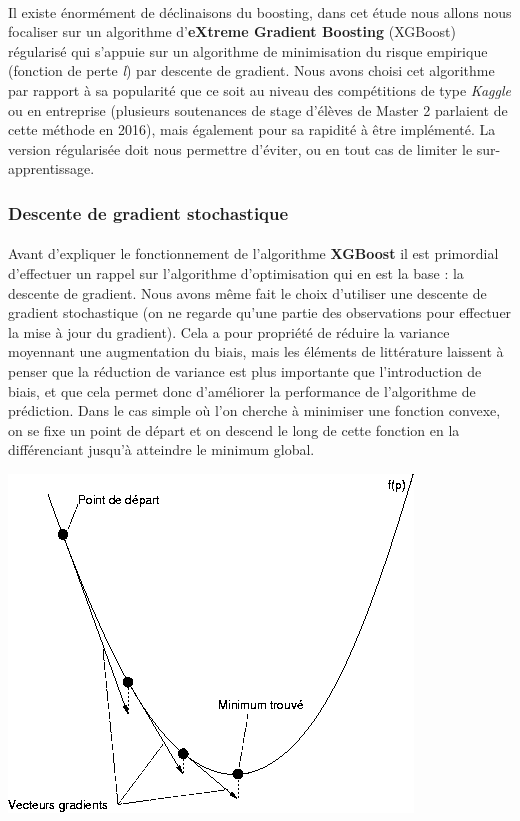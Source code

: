\documentclass[14pt, openany]{article}
\begin{document}
\paragraph{}
Il existe énormément de déclinaisons du boosting, dans cet étude nous allons nous focaliser sur un algorithme d'\textbf{eXtreme Gradient Boosting} (XGBoost) régularisé qui s'appuie sur un algorithme de minimisation du risque empirique (fonction de perte \textit{l}) par descente de gradient. Nous avons choisi cet algorithme par rapport à sa popularité que ce soit au niveau des compétitions de type \textit{Kaggle} ou en entreprise (plusieurs soutenances de stage d'élèves de Master 2 parlaient de cette méthode en 2016), mais également pour sa rapidité à être implémenté. La version régularisée doit nous permettre d'éviter, ou en tout cas de limiter le sur-apprentissage.
\subsubsection{Descente de gradient stochastique}
\paragraph{}
Avant d'expliquer le fonctionnement de l'algorithme \textbf{XGBoost} il est primordial d'effectuer un rappel sur l'algorithme d'optimisation qui en est la base : la descente de gradient. Nous avons même fait le choix d'utiliser une descente de gradient stochastique (on ne regarde qu'une partie des observations pour effectuer la mise à jour du gradient). Cela a pour propriété de réduire la variance moyennant une augmentation du biais, mais les éléments de littérature laissent à penser que la réduction de variance est plus importante que l'introduction de biais, et que cela permet donc d'améliorer la performance de l'algorithme de prédiction. Dans le cas simple où l'on cherche à minimiser une fonction convexe, on se fixe un point de départ et on \og descend \fg{} le long de cette fonction en la différenciant jusqu'à atteindre le minimum global.
\begin{center}
\includegraphics[scale=0.7]{Images/descente.png}
\end{center}
\begin{center}
\end{center}
\end{document}
